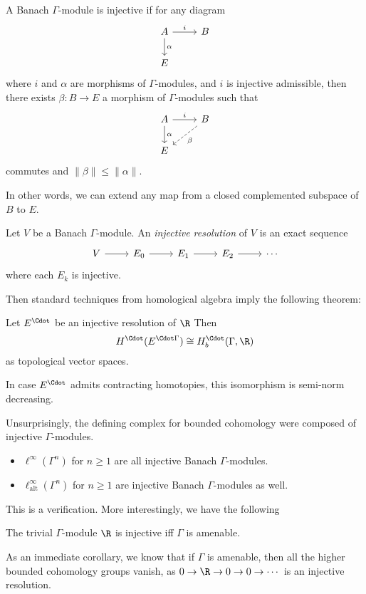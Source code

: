\documentclass[a4paper]{article}
\begin{document}
\begin{defi}
  A Banach $\Gamma$-module is injective if for any diagram
  \[
    \begin{tikzcd}
      A \ar[r, "i"] \ar[d, "\alpha"] & B\\
      E
    \end{tikzcd}
  \]
  where $i$ and $\alpha$ are morphisms of $\Gamma$-modules, and $i$ is injective admissible, then there exists $\beta \colon B \to E$ a morphism of $\Gamma$-modules such that
  \[
    \begin{tikzcd}
      A \ar[r, "i"] \ar[d, "\alpha"] & B \ar[ld, dashed, "\beta"]\\
      E
    \end{tikzcd}
  \]
  commutes and $\|\beta\| \leq \|\alpha\|$.
\end{defi}
In other words, we can extend any map from a closed complemented subspace of $B$ to $E$.

\begin{defi}
  Let $V$ be a Banach $\Gamma$-module. An \emph{injective resolution} of $V$ is an exact sequence
  \[
    \begin{tikzcd}
      V \ar[r] & E_0 \ar[r] & E_1 \ar[r] & E_2 \ar[r] & \cdots
    \end{tikzcd}
  \]
  where each $E_k$ is injective.
\end{defi}
Then standard techniques from homological algebra imply the following theorem:
\begin{thm}
  Let $E^{\Cdot}$ be an injective resolution of $\R$ Then
  \[
    H^\Cdot(E^{\Cdot \Gamma}) \cong H_b^\Cdot(\Gamma, \R)
  \]
  as topological vector spaces.

  In case $E^\Cdot$ admits contracting homotopies, this isomorphism is semi-norm decreasing.
\end{thm}

Unsurprisingly, the defining complex for bounded cohomology were composed of injective $\Gamma$-modules.
\begin{lemma}\leavevmode
  \begin{itemize}
    \item $\ell^\infty(\Gamma^n)$ for $n \geq 1$ are all injective Banach $\Gamma$-modules.
    \item $\ell_{\mathrm{alt}}^\infty(\Gamma^n)$ for $n \geq 1$ are injective Banach $\Gamma$-modules as well.
  \end{itemize}
\end{lemma}
This is a verification. More interestingly, we have the following
\begin{prop}
  The trivial $\Gamma$-module $\R$ is injective iff $\Gamma$ is amenable.
\end{prop}
As an immediate corollary, we know that if $\Gamma$ is amenable, then all the higher bounded cohomology groups vanish, as $0 \to \R \to 0 \to 0 \to \cdots$ is an injective resolution.
\end{document}
